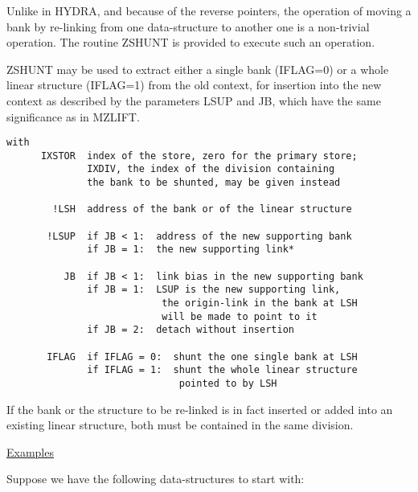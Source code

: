 Unlike in HYDRA, and because of the reverse pointers,
the operation of moving a bank by re-linking from one data-structure
to another one is a non-trivial operation.
The routine ZSHUNT is provided to execute such an operation.

ZSHUNT may be used to extract either a single bank (IFLAG=0)
or a whole linear structure (IFLAG=1) from the old context,
for insertion into the new context as described by the parameters
LSUP and JB, which have the same significance as in MZLIFT.

\begin{verbatim}
with
      IXSTOR  index of the store, zero for the primary store;
              IXDIV, the index of the division containing
              the bank to be shunted, may be given instead

        !LSH  address of the bank or of the linear structure

       !LSUP  if JB < 1:  address of the new supporting bank
              if JB = 1:  the new supporting link*

          JB  if JB < 1:  link bias in the new supporting bank
              if JB = 1:  LSUP is the new supporting link,
                           the origin-link in the bank at LSH
                           will be made to point to it
              if JB = 2:  detach without insertion

       IFLAG  if IFLAG = 0:  shunt the one single bank at LSH
              if IFLAG = 1:  shunt the whole linear structure
                              pointed to by LSH
\end{verbatim} 
If the bank or the structure to be re-linked is in fact inserted
or added into an existing linear structure,
both must be contained in the same division.

\ul{Examples}

Suppose we have the following data-structures to start with:

